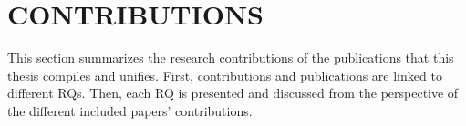 \section{CONTRIBUTIONS} \normalfont

This section summarizes the research contributions of the publications that this thesis compiles and unifies. First, contributions and publications are linked to different RQs. Then, each RQ is presented and discussed from the perspective of the different included papers' contributions.



